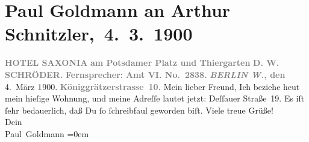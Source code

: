 

         
         \renewcommand{\erwaehntePersonen}{Personen: Paul Goldmann, D. W. Schröder}
         \renewcommand{\erwaehnteOrte}{Orte: Berlin, Dessauer Straße, Hotel Saxonia, Potsdamer Platz, Stresemannstraße, Tiergarten, Wien}
         \renewcommand{\erwaehnteWerke}{}
               \section[ Paul Goldmann an Arthur Schnitzler, 4. 3. 1900]{ Paul Goldmann an Arthur Schnitzler, 4. 3. 1900}\nopagebreak{}\rehead{ }\begin{ledgroupsized}[t]{13cm}\normalsize\beginnumbering{} \toendnotes[C]{\smallbreak\pagebreak[2]} 
\pstart
           \noindent{}\centering{}{\pb}\textcolor{gray}{\textbf{\textbf{HOTEL SAXONIA}}}\pend
           \pstart
           \noindent{}\raggedleft{}\textcolor{gray}{\textbf{am Potsdamer Platz und
                        Thiergarten}}\pend
           \pstart
           \noindent{}\centering{}\textcolor{gray}{\textbf{D. W. SCHRÖDER.}}\pend
           \pstart
           \noindent{}\textcolor{gray}{\textbf{Fernsprecher:}}\pend
           \pstart
           \textcolor{gray}{\textbf{\textbf{Amt VI. No. 2838.}}}\pend
           \pstart
           \raggedleft{}\textcolor{gray}{\textbf{\emph{BERLIN W.}, den}}{ }4. März \textcolor{gray}{\textbf{1}}900. \pend
           \pstart
           \raggedleft{}\textcolor{gray}{\textbf{Königgrätzerstrasse 10.}}\pend
           \pstart\center{}Mein lieber Freund,\pend\pstart
           Ich beziehe heut mein hieſige Wohnung, und meine
               Adreſſe lautet jetzt: Deſſauer Straße 19.\pend
           \pstart
           Es iſt ſehr bedauerlich, daß Du ſo ſchreibfaul geworden biſt.\pend
           \pstart
           Viele treue Grüße! {\\[\baselineskip]}Dein {\\[\baselineskip]}\spacefill\mbox{Paul Goldmann}\pend
           \leftskip=0em{}
         
         \endnumbering{}\end{ledgroupsized}  \newcommand{\dateiname}{L02906}\newcommand{\titel}{Paul Goldmann an Arthur Schnitzler, 4. 3. 1900}\newcommand{\editorInnen}{Martin Anton Müller und Laura Untner}
      